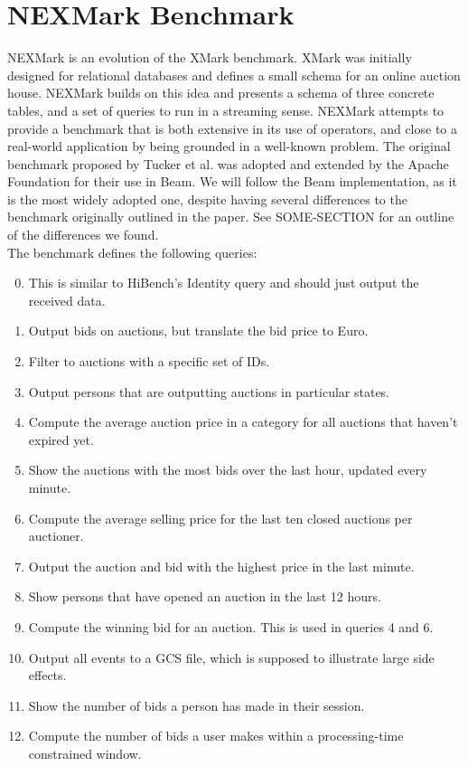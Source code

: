 \section{NEXMark Benchmark\cite{nexmark}}
NEXMark is an evolution of the XMark benchmark. XMark was initially designed for relational databases and defines a small schema for an online auction house. NEXMark builds on this idea and presents a schema of three concrete tables, and a set of queries to run in a streaming sense. NEXMark attempts to provide a benchmark that is both extensive in its use of operators, and close to a real-world application by being grounded in a well-known problem. The original benchmark proposed by Tucker et al. was adopted and extended by the Apache Foundation for their use in Beam\cite{nexmark-beam}. We will follow the Beam implementation, as it is the most widely adopted one, despite having several differences to the benchmark originally outlined in the paper. See SOME-SECTION for an outline of the differences we found. \\

The benchmark defines the following queries:

\begin{enumerate}
  \setcounter{enumi}{-1}
\item {} This is similar to HiBench's Identity query and should just output the received data.
\item {} Output bids on auctions, but translate the bid price to Euro.
\item {} Filter to auctions with a specific set of IDs.
\item {} Output persons that are outputting auctions in particular states.
\item {} Compute the average auction price in a category for all auctions that haven't expired yet.
\item {} Show the auctions with the most bids over the last hour, updated every minute.
\item {} Compute the average selling price for the last ten closed auctions per auctioner.
\item {} Output the auction and bid with the highest price in the last minute.
\item {} Show persons that have opened an auction in the last 12 hours.
\item {} Compute the winning bid for an auction. This is used in queries 4 and 6.
\item {} Output all events to a GCS file, which is supposed to illustrate large side effects.
\item {} Show the number of bids a person has made in their session.
\item {} Compute the number of bids a user makes within a processing-time constrained window.
\end{enumerate}

